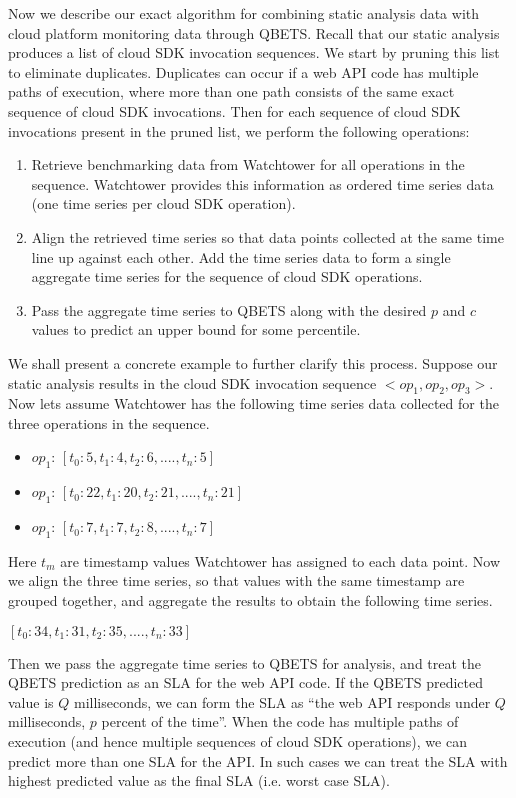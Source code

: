 Now we describe our exact algorithm for combining static analysis data with cloud platform monitoring 
data through QBETS. Recall that our static analysis produces a list of cloud SDK invocation sequences.
We start by pruning this list to eliminate duplicates. Duplicates can occur if a web API code has
multiple paths of execution, where more than one path consists of the same exact sequence of cloud 
SDK invocations. Then for each sequence of cloud SDK invocations present in the pruned list, we
perform the following operations:

\begin{enumerate}
\item Retrieve benchmarking data from Watchtower for all operations in the sequence. Watchtower provides
this information as ordered time series data (one time series per cloud SDK operation).
\item Align the retrieved time series so that data points collected at the same time line up against each other.
Add the time series data to form a single aggregate time series for the sequence of cloud SDK operations.
\item Pass the aggregate time series to QBETS along with the desired $p$ and $c$ values to predict an
upper bound for some percentile. 
\end{enumerate}

We shall present a concrete example to further clarify this process. Suppose our static analysis results in the
cloud SDK invocation sequence $<op_{1},op_{2},op_{3}>$. Now lets assume Watchtower has the following
time series data collected for the three operations in the sequence.

\begin{itemize}
\item $op_{1}$: $[t_{0}: 5, t_{1}: 4, t_{2}: 6, ...., t_{n}: 5]$
\item $op_{1}$: $[t_{0}: 22, t_{1}: 20, t_{2}: 21, ...., t_{n}: 21]$
\item $op_{1}$: $[t_{0}: 7, t_{1}: 7, t_{2}: 8, ...., t_{n}: 7]$
\end{itemize}

Here $t_{m}$ are timestamp values Watchtower has assigned to each data point. Now we align the three
time series, so that values with the same timestamp are grouped together, and aggregate the results
to obtain the following time series.

$[t_{0}: 34, t_{1}: 31, t_{2}: 35, ...., t_{n}: 33]$

Then we pass the aggregate time series to QBETS for analysis, and
treat the QBETS prediction as an SLA for the web API code.
If the QBETS predicted value is $Q$ milliseconds, we can form the SLA as ``the web API responds 
under $Q$ milliseconds, $p$ percent of the time''. When the code has multiple paths of execution (and
hence multiple sequences of cloud SDK operations), we can predict more than one SLA for the API. In
such cases we can treat the SLA with highest predicted value as the final SLA (i.e. worst case SLA).

